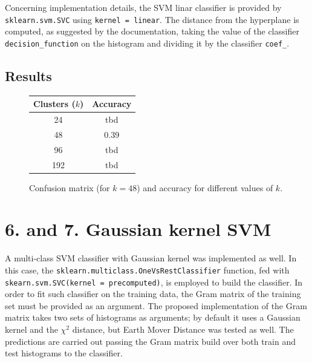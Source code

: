 \documentclass[12pt]{article}
\begin{document}
  Concerning implementation details, the SVM linar classifier is provided by \texttt{sklearn.svm.SVC} using \texttt{kernel = linear}. The distance from the hyperplane is computed, as suggested by the documentation, taking the value of the classifier \texttt{decision\_function} on the histogram and dividing it by the classifier \texttt{coef\_}.

  \subsection*{Results}

  \begin{figure}[H]
    \centering
    \caption*{Confusion matrix (for \( k = 48 \)) and accuracy for different values of \( k \).}
    \quad\quad\quad
    \begin{tabular}[b]{cc}
			\toprule
      Clusters (\( k \)) & Accuracy \\
      \midrule
      24  & tbd \\
      48  & 0.39 \\
      96  & tbd \\
      192 & tbd \\
      \bottomrule
    \end{tabular}
  \end{figure}



  \section*{6. and 7. Gaussian kernel SVM}

  A multi-class SVM classifier with Gaussian kernel was implemented as well. In this case, the \texttt{sklearn.multiclass.OneVsRestClassifier} function, fed with \texttt{skearn.svm.SVC(kernel = precomputed)}, is employed to build the classifier. In order to fit such classifier on the training data, the Gram matrix of the training set must be provided as an argument. The proposed implementation of the Gram matrix takes two sets of histograms as arguments; by default it uses a Gaussian kernel and the \( \chi^2 \) distance, but Earth Mover Distance was tested as well. The predictions are carried out passing the Gram matrix build over both train and test histograms to the classifier.
\end{document}
